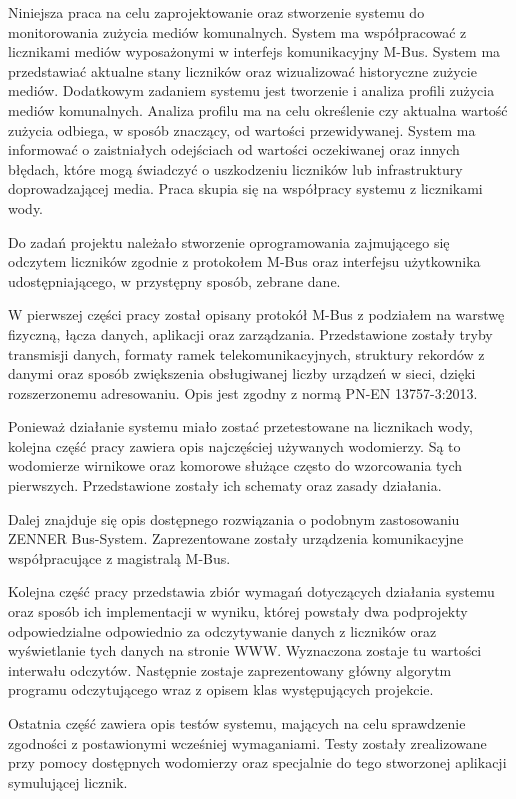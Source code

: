
Niniejsza praca na celu zaprojektowanie oraz stworzenie systemu do monitorowania zużycia mediów komunalnych.
System ma współpracować z licznikami mediów wyposażonymi w interfejs komunikacyjny M-Bus.
System ma przedstawiać aktualne stany liczników oraz wizualizować historyczne zużycie mediów.
Dodatkowym zadaniem systemu jest tworzenie i analiza profili zużycia mediów komunalnych.
Analiza profilu ma na celu określenie czy aktualna wartość zużycia odbiega, w sposób znaczący, od wartości przewidywanej.
System ma informować o zaistniałych odejściach od wartości oczekiwanej oraz innych błędach, które mogą świadczyć o uszkodzeniu liczników lub infrastruktury doprowadzającej media.
Praca skupia się na współpracy systemu z licznikami wody.

Do zadań projektu należało stworzenie oprogramowania zajmującego się odczytem liczników zgodnie z protokołem M-Bus oraz interfejsu użytkownika udostępniającego, w przystępny sposób, zebrane dane.

W pierwszej części pracy został opisany protokół M-Bus z podziałem na warstwę fizyczną, łącza danych, aplikacji oraz zarządzania.
Przedstawione zostały tryby transmisji danych, formaty ramek telekomunikacyjnych, struktury rekordów z danymi oraz sposób zwiększenia obsługiwanej liczby urządzeń w sieci, dzięki rozszerzonemu adresowaniu.
Opis jest zgodny z normą PN-EN 13757-3:2013.

Ponieważ działanie systemu miało zostać przetestowane na licznikach wody, kolejna część pracy zawiera opis najczęściej używanych wodomierzy.
Są to wodomierze wirnikowe oraz komorowe służące często do wzorcowania tych pierwszych.
Przedstawione zostały ich schematy oraz zasady działania.

Dalej znajduje się opis dostępnego rozwiązania o podobnym zastosowaniu ZENNER Bus-System.
Zaprezentowane zostały urządzenia komunikacyjne współpracujące z magistralą M-Bus.

Kolejna część pracy przedstawia zbiór wymagań dotyczących działania systemu oraz sposób ich implementacji w wyniku, której powstały dwa podprojekty odpowiedzialne odpowiednio za odczytywanie danych z liczników oraz wyświetlanie tych danych na stronie WWW.
Wyznaczona zostaje tu wartości interwału odczytów.
Następnie zostaje zaprezentowany główny algorytm  programu odczytującego wraz z opisem klas występujących projekcie.

Ostatnia część zawiera opis testów systemu, mających na celu sprawdzenie zgodności z postawionymi wcześniej wymaganiami.
Testy zostały zrealizowane przy pomocy dostępnych wodomierzy oraz specjalnie do tego stworzonej aplikacji symulującej licznik.

\pagebreak



\pagebreak